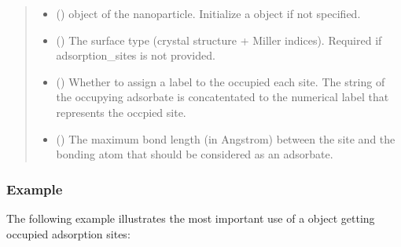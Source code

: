\documentclass[letterpaper,10pt,english]{sphinxmanual}
\begin{document}
\begin{fulllineitems}
\begin{quote}
\begin{description}
\begin{itemize}
\item {} 
 (\sphinxstyleliteralemphasis{\sphinxupquote{,         }}) \textendash{}  object of the nanoparticle. Initialize a
 object if not specified.

\item {} 
 () \textendash{} The surface type (crystal structure + Miller indices).
Required if adsorption\_sites is not provided.

\item {} 
 (\sphinxstyleliteralemphasis{\sphinxupquote{, }}) \textendash{} Whether to assign a label to the occupied each site. The string
of the occupying adsorbate is concatentated to the numerical
label that represents the occpied site.

\item {} 
 (\sphinxstyleliteralemphasis{\sphinxupquote{, }}) \textendash{} The maximum bond length (in Angstrom) between the site and the
bonding atom  that should be considered as an adsorbate.

\end{itemize}

\end{description}\end{quote}
\subsubsection*{Example}

The following example illustrates the most important use of a
 object \sphinxhyphen{} getting occupied adsorption sites:


\end{fulllineitems}
\end{document}
